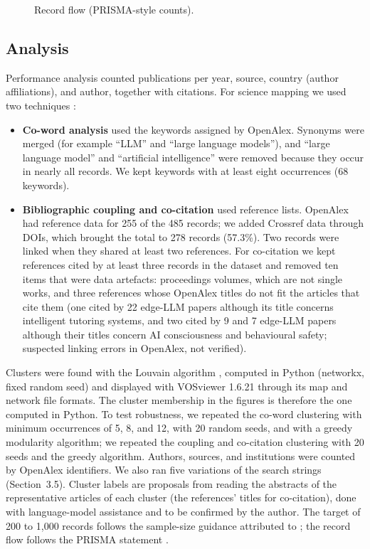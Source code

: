 \begin{figure}[htbp]
\centering
{}
\caption{Record flow (PRISMA-style counts). }
\label{fig:prisma}
\end{figure}

\subsection{Analysis}
Performance analysis counted publications per year, source, country (author affiliations), and author, together with citations. For science mapping we used two techniques \citep{donthu2021,zupic2015}:
\begin{itemize}
  \item \textbf{Co-word analysis} used the keywords assigned by OpenAlex. Synonyms were merged (for example ``LLM'' and ``large language models''), and ``large language model'' and ``artificial intelligence'' were removed because they occur in nearly all records. We kept keywords with at least eight occurrences (68 keywords).
  \item \textbf{Bibliographic coupling and co-citation} used reference lists. OpenAlex had reference data for 255 of the 485 records; we added Crossref data through DOIs, which brought the total to 278 records (57.3\%). Two records were linked when they shared at least two references. For co-citation we kept references cited by at least three records in the dataset and removed ten items that were data artefacts: proceedings volumes, which are not single works, and three references whose OpenAlex titles do not fit the articles that cite them (one cited by 22 edge-LLM papers although its title concerns intelligent tutoring systems, and two cited by 9 and 7 edge-LLM papers although their titles concern AI consciousness and behavioural safety; suspected linking errors in OpenAlex, not verified).
\end{itemize}
Clusters were found with the Louvain algorithm \citep{blondel2008}, computed in Python (networkx, fixed random seed) and displayed with VOSviewer 1.6.21 \citep{vaneck2010} through its map and network file formats. The cluster membership in the figures is therefore the one computed in Python. To test robustness, we repeated the co-word clustering with minimum occurrences of 5, 8, and 12, with 20 random seeds, and with a greedy modularity algorithm; we repeated the coupling and co-citation clustering with 20 seeds and the greedy algorithm. Authors, sources, and institutions were counted by OpenAlex identifiers. We also ran five variations of the search strings (Section~3.5). Cluster labels are proposals from reading the abstracts of the representative articles of each cluster (the references' titles for co-citation), done with language-model assistance and to be confirmed by the author. The target of 200 to 1{,}000 records follows the sample-size guidance attributed to \citet{rogers2020} ; the record flow follows the PRISMA statement \citep{page2021}.
